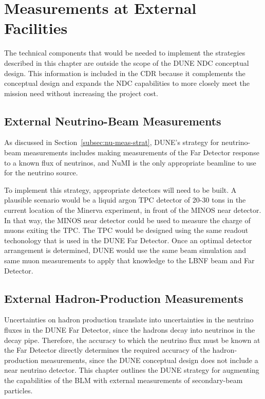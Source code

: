
\chapter{Measurements at External Facilities}
\label{ch:ext-meas}


The technical components that would be needed to implement the strategies 
described in this chapter are outside the scope of the DUNE NDC conceptual 
design. This information is included in the CDR because it complements the conceptual 
design and expands the NDC capabilities to more closely meet the mission need without increasing the project cost.


\section{External Neutrino-Beam Measurements}
As discussed in Section~\ref{subsec:nu-meas-strat}, DUNE's strategy for neutrino-beam measurements includes making measurements of the Far Detector response to a known flux of neutrinos, and NuMI is the only appropriate beamline to use for the neutrino source.

To implement this strategy, appropriate detectors will need to be built.  A plausible scenario would be a liquid argon TPC detector of 20-30 tons in the current location of the Minerva experiment, in front of the MINOS near detector. In that way, the MINOS near detector could be used to measure the charge of muons exiting the TPC. The TPC would be designed using the same readout techonology that is used in the DUNE Far Detector.  Once an optimal detector arrangement is determined, DUNE would use the same beam simulation and same muon measurements to apply that knowledge to the LBNF beam and Far Detector.

\section{External Hadron-Production Measurements}
\label{sec:hadron}

Uncertainties on hadron production translate into uncertainties in the neutrino fluxes in the DUNE Far Detector, since the hadrons decay into neutrinos in the decay pipe.  
Therefore, the accuracy to which the neutrino flux must be known at the Far Detector directly determines the required accuracy 
of the hadron-production measurements, since the DUNE conceptual design does not include a near neutrino detector. This chapter outlines the DUNE strategy for augmenting the capabilities of the BLM with external measurements of secondary-beam particles.  

